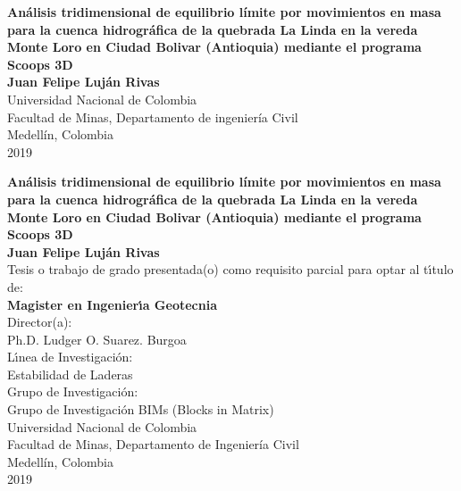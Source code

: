 

\begin{center}
\begin{figure}
\centering%
%
\end{figure}
\thispagestyle{empty} \vspace*{1.5cm} \textbf{\huge
An\'{a}lisis tridimensional de equilibrio l\'{i}mite por movimientos en masa para la cuenca hidrogr\'{a}fica de la quebrada La Linda en la vereda Monte Loro en Ciudad Bolivar (Antioquia) mediante el programa Scoops 3D}\\[4.0cm]
\Large\textbf{Juan Felipe Luj\'{a}n Rivas}\\[4.0cm]
\small Universidad Nacional de Colombia\\
Facultad de Minas, Departamento de ingenier\'{i}a Civil \\
Medell\'{i}n, Colombia\\
2019\\
\end{center}

\newpage{\pagestyle{empty}\cleardoublepage}

\newpage
\begin{center}
\thispagestyle{empty} \vspace*{0cm} \textbf{\huge
An\'{a}lisis tridimensional de equilibrio l\'{i}mite por movimientos en masa para la cuenca hidrogr\'{a}fica de la quebrada La Linda en la vereda Monte Loro en Ciudad Bolivar (Antioquia) mediante el programa Scoops 3D}\\[2.0cm]
\Large\textbf{Juan Felipe Luj\'{a}n Rivas}\\[2.0cm]
\small Tesis o trabajo de grado presentada(o) como requisito parcial para optar al
t\'{\i}tulo de:\\
\textbf{ Magister en Ingenier\'{\i}a Geotecnia}\\[1.5cm]
Director(a):\\
Ph.D. Ludger O. Suarez. Burgoa\\[1.0cm]
L\'{\i}nea de Investigaci\'{o}n:\\
Estabilidad de Laderas\\
Grupo de Investigaci\'{o}n:\\
Grupo de Investigaci\'{o}n BIMs (Blocks in Matrix)\\[0.5cm]
Universidad Nacional de Colombia\\
Facultad de Minas, Departamento de Ingenier\'{i}a Civil\\
Medell\'in, Colombia\\
2019\\
\end{center}




